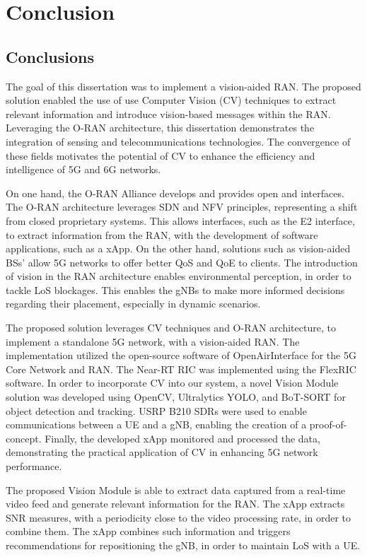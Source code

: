 \chapter{Conclusion}\label{ch:conclusion}

\section{Conclusions}\label{sec:conclusions}
The goal of this dissertation was to implement a vision-aided RAN\@.
The proposed solution enabled the use of use Computer Vision (CV) techniques to extract relevant information and introduce vision-based messages within the RAN\@.
Leveraging the O-RAN architecture, this dissertation demonstrates the integration of sensing and telecommunications technologies.
The convergence of these fields motivates the potential of CV to enhance the efficiency and intelligence of 5G and 6G networks.

On one hand, the O-RAN Alliance develops and provides open and interfaces.
The O-RAN architecture leverages SDN and NFV principles, representing a shift from closed proprietary systems.
This allows interfaces, such as the E2 interface, to extract information from the RAN, with the development of software applications, such as a xApp.
On the other hand, solutions such as vision-aided BSs' allow 5G networks to offer better QoS and QoE to clients.
The introduction of vision in the RAN architecture enables environmental perception, in order to tackle LoS blockages.
This enables the gNBs to make more informed decisions regarding their placement, especially in dynamic scenarios.

The proposed solution leverages CV techniques and O-RAN architecture, to implement a standalone 5G network, with a vision-aided RAN\@.
The implementation utilized the open-source software of OpenAirInterface for the 5G Core Network and RAN\@.
The Near-RT RIC was implemented using the FlexRIC software.
In order to incorporate CV into our system, a novel Vision Module solution was developed using OpenCV, Ultralytics YOLO, and BoT-SORT for object detection and tracking.
USRP B210 SDRs were used to enable communications between a UE and a gNB, enabling the creation of a proof-of-concept.
Finally, the developed xApp monitored and processed the data, demonstrating the practical application of CV in enhancing 5G network performance.

The proposed Vision Module is able to extract data captured from a real-time video feed and generate relevant information for the RAN\@.
The xApp extracts SNR measures, with a periodicity close to the video processing rate, in order to combine them.
The xApp combines such information and triggers recommendations for repositioning the gNB, in order to maintain LoS with a UE\@.

